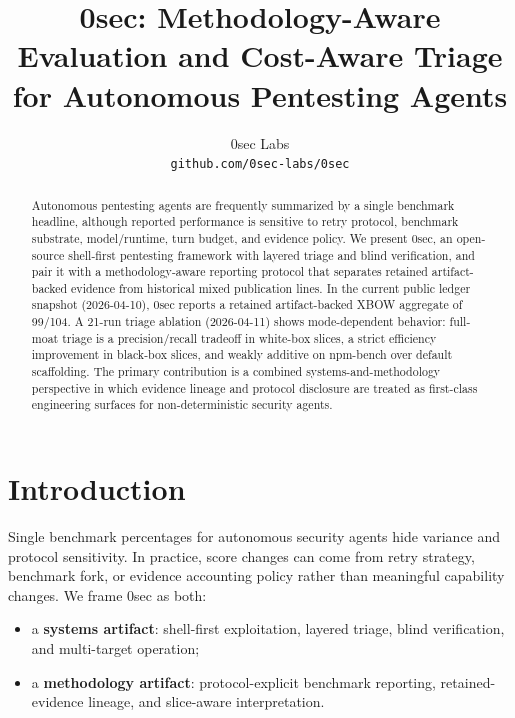 \documentclass[11pt]{article}
\title{0sec: Methodology-Aware Evaluation and Cost-Aware Triage for Autonomous Pentesting Agents}
\author{
  0sec Labs \\
  \texttt{github.com/0sec-labs/0sec}
}
\date{}
\begin{document}
\maketitle

\begin{abstract}
Autonomous pentesting agents are frequently summarized by a single benchmark
headline, although reported performance is sensitive to retry protocol,
benchmark substrate, model/runtime, turn budget, and evidence policy. We
present 0sec, an open-source shell-first pentesting framework with layered
triage and blind verification, and pair it with a methodology-aware reporting
protocol that separates retained artifact-backed evidence from historical mixed
publication lines. In the current public ledger snapshot (2026-04-10), 0sec
reports a retained artifact-backed XBOW aggregate of 99/104. A 21-run triage
ablation (2026-04-11) shows mode-dependent behavior: full-moat triage is a
precision/recall tradeoff in white-box slices, a strict efficiency improvement
in black-box slices, and weakly additive on npm-bench over default scaffolding.
The primary contribution is a combined systems-and-methodology perspective in
which evidence lineage and protocol disclosure are treated as first-class
engineering surfaces for non-deterministic security agents.
\end{abstract}

\section{Introduction}

Single benchmark percentages for autonomous security agents hide variance and
protocol sensitivity. In practice, score changes can come from retry strategy,
benchmark fork, or evidence accounting policy rather than meaningful capability
changes. We frame 0sec as both:

\begin{itemize}[leftmargin=*]
  \item a \textbf{systems artifact}: shell-first exploitation, layered triage,
  blind verification, and multi-target operation;
  \item a \textbf{methodology artifact}: protocol-explicit benchmark reporting,
  retained-evidence lineage, and slice-aware interpretation.
\end{itemize}
\end{document}
